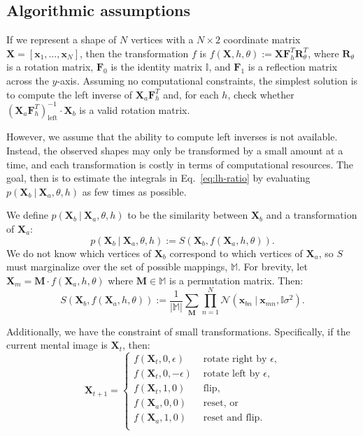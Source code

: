 \documentclass[10pt,letterpaper]{article}
\newcommand{\Xa}[0]{\mathbf{X}_a}
\newcommand{\Xb}[0]{\mathbf{X}_b}
\newcommand{\Xt}[0]{\mathbf{X}_t}
\newcommand{\R}[0]{\mathbf{R}_\theta}
\newcommand{\F}[0]{\mathbf{F}}
\newcommand{\M}[0]{\mathbf{M}}
\newcommand{\I}[0]{\mathbb{I}}
\begin{document}
\subsection{Algorithmic assumptions}

If we represent a shape of $N$ vertices with a $N\times 2$ coordinate
matrix $\mathbf{X}=[\mathbf{x}_1, \ldots{}, \mathbf{x}_N]$, then the
transformation $f$ is $f(\mathbf{X}, h,
\theta):=\mathbf{X}\F_h^T\R^T$, where $\R$ is a rotation matrix,
$\F_0$ is the identity matrix $\I$, and $\F_1$ is a reflection matrix
across the $y$-axis. Assuming no computational constraints, the
simplest solution is to compute the left inverse of $\Xa\F_h^T$ and,
for each $h$, check whether $(\Xa
\F_h^T)_\mathrm{left}^{-1}\cdot{}\Xb$ is a valid rotation matrix.

However, we assume that the ability to compute left inverses is not
available. Instead, the observed shapes may only be transformed by a
small amount at a time, and each transformation is costly in terms of
computational resources. The goal, then is to estimate the integrals
in Eq.~\ref{eq:lh-ratio} by evaluating $p(\Xb\ \vert\ \Xa, \theta, h)$
as few times as possible. 

We define $p(\Xb\ \vert\ \Xa, \theta, h)$ to be the similarity between
$\Xb$ and a transformation of $\Xa$:
\begin{equation}
  p(\Xb\ \vert\ \Xa, \theta, h):= S(\Xb, f(\Xa, h, \theta)).
  \label{eq:likelihood}
\end{equation}
We do not know which vertices of $\Xb$ correspond to which vertices of
$\Xa$, so $S$ must marginalize over the set of possible mappings,
$\mathbb{M}$. For brevity, let $\mathbf{X}_m=\M\cdot{}f(\Xa, h,
\theta)$ where $\M\in\mathbb{M}$ is a permutation matrix. Then:
\begin{equation}
  S(\Xb, f(\Xa, h, \theta)):=\frac{1}{|\mathbb{M}|} \sum_{\M} \prod_{n=1}^N \mathcal{N}(\mathbf{x}_{bn}\ \vert \ \mathbf{x}_{mn}, \I\sigma^2).
  \label{eq:similarity}
\end{equation}

Additionally, we have the constraint of small
transformations. Specifically, if the current mental image is $\Xt$,
then:
\begin{equation}
  \mathbf{X}_{t+1} = \left\{ \begin{array}{ll}
      f(\Xt, 0, \epsilon) &\mbox{ rotate right by $\epsilon$,} \\
      f(\Xt, 0, -\epsilon) &\mbox{ rotate left by $\epsilon$,} \\
      f(\Xt, 1, 0) &\mbox{ flip,} \\
      f(\Xa, 0, 0) &\mbox{ reset, or} \\
      f(\Xa, 1, 0) &\mbox{ reset and flip.} \\
    \end{array} \right.
  \label{eq:actions}
\end{equation}
\end{document}
